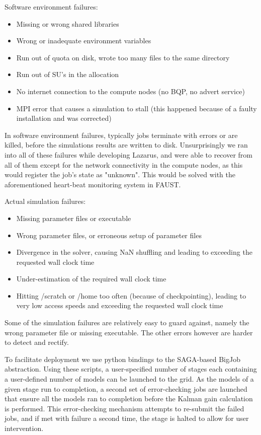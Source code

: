 \documentclass[conference,final]{IEEEtran}
\begin{document}
Software environment failures:
\begin{itemize}
\item{Missing or wrong shared libraries}
\item{Wrong or inadequate environment variables}
\item{Run out of quota on disk, wrote too many files to the same directory}
\item{Run out of SU's in the allocation}
\item{No internet connection to the compute nodes (no BQP, no advert service)}
\item{MPI error that causes a simulation to stall (this happened because of a faulty installation and was corrected)}
\end{itemize}
In software environment failures, typically jobs terminate with errors
or are killed, before the simulations results are written to
disk. Unsurprisingly we ran into all of these failures while
developing Lazarus, and were able to recover from all of them except
for the network connectivity in the compute nodes, as this would
register the job's state as "unknown". This would be solved with the
aforementioned heart-beat monitoring system in FAUST.

Actual simulation failures:
\begin{itemize}
\item{Missing parameter files or executable}
\item{Wrong parameter files, or erroneous setup of parameter files}
\item{Divergence in the solver, causing NaN shuffling and leading to exceeding the requested wall clock time}
\item{Under-estimation of the required wall clock time}
\item{Hitting /scratch or /home too often (because of checkpointing), leading to very low access speeds and exceeding the requested wall clock time}
\end{itemize}
Some of the simulation failures are relatively easy to guard against,
namely the wrong parameter file or missing executable. The other errors
however are harder to detect and rectify.

To facilitate deployment we use python bindings to the SAGA-based
BigJob abstraction. Using these scripts, a user-specified number of
stages each containing a user-defined number of models can be launched
to the grid. As the models of a given stage run to completion, a
second set of error-checking jobs are launched that ensure all the
models ran to completion before the Kalman gain calculation is
performed. This error-checking mechanism attempts to re-submit the
failed jobs, and if met with failure a second time, the stage is
halted to allow for user intervention.
\end{document}
